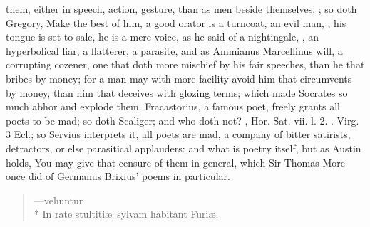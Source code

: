 {them, either in speech, action, gesture, than as men beside themselves,
; so doth Gregory,  Make the best of him, a good orator is a turncoat, an
evil man, , his tongue is set to sale, he is a
mere voice, as he said of a nightingale, , an
hyperbolical liar, a flatterer, a parasite, and as  Ammianus
Marcellinus will, a corrupting cozener, one that doth more mischief by
his fair speeches, than he that bribes by money; for a man may with
more facility avoid him that circumvents by money, than him that
deceives with glozing terms; which made Socrates so much abhor and
explode them. Fracastorius, a famous poet, freely grants all poets
to be mad; so doth Scaliger; and who doth not? , Hor. Sat. vii. l. 2.
. Virg. 3 Ecl.; so Servius
interprets it, all poets are mad, a company of bitter satirists,
detractors, or else parasitical applauders: and what is poetry itself,
but as Austin holds,  You
may give that censure of them in general, which Sir Thomas More once
did of Germanus Brixius' poems in particular.

\begin{verse}
---\textlatin{vehuntur}\\*
\textlatin{In rate stultiti\ae{}\ sylvam habitant Furi\ae{}.}
\end{verse}

}
